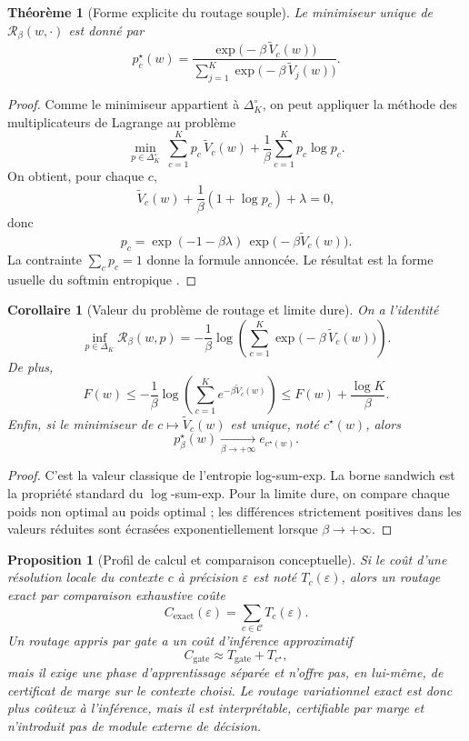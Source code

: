 \documentclass[11pt,a4paper]{article}
\newtheorem{proposition}{Proposition}[section]
\newtheorem{theorem}{Théorème}[section]
\newtheorem{corollary}{Corollaire}[section]
\newcommand{\Ccal}{\mathcal C}
\newcommand{\Rcal}{\mathcal R}
\begin{document}
\begin{theorem}[Forme explicite du routage souple]
Le minimiseur unique de \(\Rcal_\beta(w,\cdot)\) est donné par
\[
p_c^\star(w)=\frac{\exp\!\bigl(-\beta\,\widetilde V_c(w)\bigr)}
{\sum_{j=1}^K \exp\!\bigl(-\beta\,\widetilde V_j(w)\bigr)}.
\]
\end{theorem}

\begin{proof}
Comme le minimiseur appartient à \(\Delta_K^\circ\), on peut appliquer la méthode des multiplicateurs de Lagrange au problème
\[
\min_{p\in\Delta_K^\circ}\ \sum_{c=1}^K p_c\,\widetilde V_c(w)+\frac{1}{\beta}\sum_{c=1}^K p_c\log p_c.
\]
On obtient, pour chaque \(c\),
\[
\widetilde V_c(w)+\frac{1}{\beta}(1+\log p_c)+\lambda=0,
\]
donc
\[
p_c=\exp(-1-\beta\lambda)\,\exp\!\bigl(-\beta\widetilde V_c(w)\bigr).
\]
La contrainte \(\sum_c p_c=1\) donne la formule annoncée. Le résultat est la forme usuelle du softmin entropique \cite{BauschkeCombettes2017,RockafellarWets1998}.
\end{proof}

\begin{corollary}[Valeur du problème de routage et limite dure]
On a l'identité
\[
\inf_{p\in\Delta_K}\Rcal_\beta(w,p)
=
-\frac{1}{\beta}\log\!\left(\sum_{c=1}^K \exp\!\bigl(-\beta\,\widetilde V_c(w)\bigr)\right).
\]
De plus,
\[
F(w)\le -\frac{1}{\beta}\log\!\left(\sum_{c=1}^K e^{-\beta \widetilde V_c(w)}\right)\le F(w)+\frac{\log K}{\beta}.
\]
Enfin, si le minimiseur de \(c\mapsto \widetilde V_c(w)\) est unique, noté \(c^\star(w)\), alors
\[
p^\star_\beta(w)\xrightarrow[\beta\to+\infty]{}e_{c^\star(w)}.
\]
\end{corollary}

\begin{proof}
C'est la valeur classique de l'entropie log-sum-exp. La borne sandwich est la propriété standard du \(\log\)-sum-exp. Pour la limite dure, on compare chaque poids non optimal au poids optimal ; les différences strictement positives dans les valeurs réduites sont écrasées exponentiellement lorsque \(\beta\to+\infty\).
\end{proof}

\begin{proposition}[Profil de calcul et comparaison conceptuelle]
Si le coût d'une résolution locale du contexte \(c\) à précision \(\varepsilon\) est noté \(T_c(\varepsilon)\), alors un routage exact par comparaison exhaustive coûte
\[
C_{\mathrm{exact}}(\varepsilon)=\sum_{c\in\Ccal}T_c(\varepsilon).
\]
Un routage appris par gate a un coût d'inférence approximatif
\[
C_{\mathrm{gate}}\approx T_{\mathrm{gate}}+T_{c^\star},
\]
mais il exige une phase d'apprentissage séparée et n'offre pas, en lui-même, de certificat de marge sur le contexte choisi. Le routage variationnel exact est donc plus coûteux à l'inférence, mais il est interprétable, certifiable par marge et n'introduit pas de module externe de décision.
\end{proposition}
\end{document}
